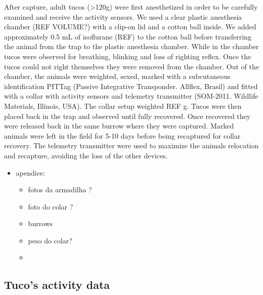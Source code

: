 \documentclass[msc,numbers,hidelinks]{coppe}
\providecommand{\tightlist}{%
  \setlength{\itemsep}{0pt}\setlength{\parskip}{0pt}}
\begin{document}
  After capture, adult tucos (\textgreater120g) were first anesthetized in order to be carefully examined and receive the activity sensors. We used a clear plastic anesthesia chamber (REF VOLUME?) with a clip-on lid and a cotton ball inside. We added approximately 0.5 mL of isoflurane (REF) to the cotton ball before transferring the animal from the trap to the plastic anesthesia chamber. While in the chamber tucos were observed for breathing, blinking and loss of righting reflex. Once the tucos could not right themselves they were removed from the chamber. Out of the chamber, the animals were weighted, sexed, marked with a subcutaneous identification PITTag (Passive Integrative Transponder. Allflex, Brasil) and fitted with a collar with activity sensors and telemetry transmitter (SOM-2011. Wildlife Materials, Illinois, USA). The collar setup weighted REF g. Tucos were then placed back in the trap and observed until fully recovered. Once recovered they were released back in the same burrow where they were captured. Marked animals were left in the field for 5-10 days before being recaptured for collar recovery. The telemetry transmitter were used to maximize the animals relocation and recapture, avoiding the loss of the other devices.
  \begin{itemize}
  \tightlist
  \item
    apendice:
    \begin{itemize}
    \tightlist
    \item
      fotos da armadilha ?
    \item
      foto do colar ?
    \item
      burrows
    \item
      peso do colar?
    \item
    \end{itemize}
  \end{itemize}
  \hypertarget{tucos-activity-data}{%
  \subsection{Tuco's activity data}\label{tucos-activity-data}}
\end{document}
